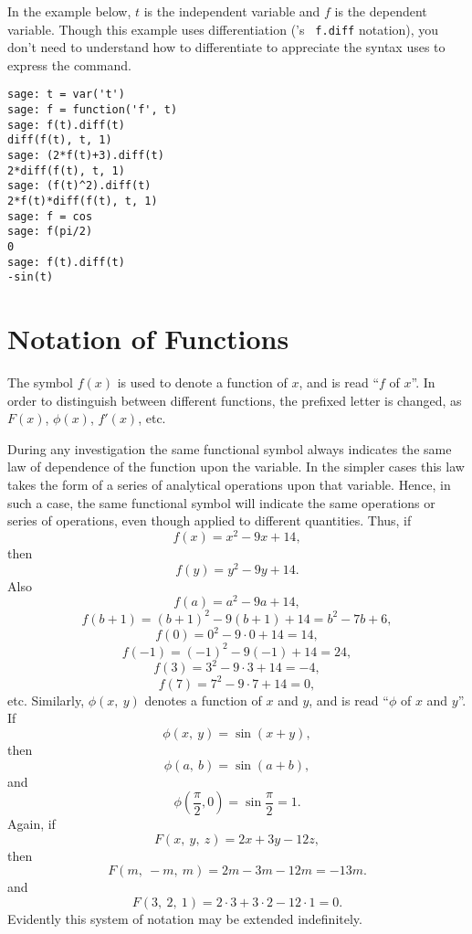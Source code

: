 In the \SAGE example below, $t$ is the independent variable and $f$ is the
dependent variable. Though this example uses differentiation (\SAGE's {\tt
f.diff} notation), you don't need to understand how to differentiate to
appreciate the syntax \SAGE uses to express the command.

\begin{Verbatim}[fontsize=\scriptsize,fontfamily=courier,fontshape=tt,frame=single,label=\SAGE]
sage: t = var('t')
sage: f = function('f', t)
sage: f(t).diff(t)
diff(f(t), t, 1)
sage: (2*f(t)+3).diff(t)
2*diff(f(t), t, 1)
sage: (f(t)^2).diff(t)
2*f(t)*diff(f(t), t, 1)
sage: f = cos
sage: f(pi/2)
0
sage: f(t).diff(t)
-sin(t)
\end{Verbatim}

\section{Notation of Functions}
\label{sec:02:06}

The symbol $f \left( x \right)$ is used to denote a function of $x$, and is
read ``$f$ of $x$''. In order to distinguish between different functions, the
prefixed letter is changed, as $F \left( x \right)$, $\phi \left( x \right)$,
$f' \left( x \right)$, etc.

During any investigation the same functional symbol always indicates the same
law of dependence of the function upon the variable.  In the simpler cases this
law takes the form of a series of analytical operations upon that variable.
Hence, in such a case, the same functional symbol will indicate the same
operations or series of operations, even though applied to different quantities.
Thus, if
\[
  f \left( x \right) = x^2 - 9x + 14,
\]
then 	
\[
  f \left( y \right) 	= y^2 - 9y + 14.
\]
Also 	
\[
  f \left( a \right) 	= a^2 - 9a + 14,
\]
\[
  f \left( b + 1 \right) =  \left( b + 1 \right)^2 - 9 \left( b + 1 \right) + 14
  = b^2 - 7b + 6,
\]
\[
  f \left( 0 \right) 	= 0^2 - 9 \cdot 0 + 14 = 14,
\]
\[
  f \left( -1 \right) 	=  \left( -1 \right)^2 - 9 \left( -1 \right) + 14 = 24,
\]
\[
  f \left( 3 \right) 	= 3^2 - 9 \cdot 3 + 14 = - 4,
\]
\[
  f \left( 7 \right) 	= 7^2 - 9 \cdot 7 + 14 = 0,
\]
etc. Similarly, $\phi \left( x,\ y \right)$ denotes a function of $x$ and $y$,
and is read ``$\phi$ of $x$ and $y$''. If 	
\[
  \phi \left( x,\ y \right) 	= \sin \left( x + y \right),
\]
then 	
\[
  \phi \left( a,\ b \right) 	= \sin \left( a + b \right),
\]
and 	
\[
  \phi \left( \frac{\pi}{2}, 0 \right)	= \sin \frac{\pi}{2} = 1.
\]
Again, if 	
\[
  F \left(  x,\ y,\ z  \right) 	= 2x + 3y - 12z,
\]
then 	
\[
  F \left( m,\ -m,\ m \right) 	= 2m - 3m - 12m = - 13m.
\]
and 	
\[
  F \left( 3,\ 2,\ 1 \right) 	= 2 \cdot 3 + 3 \cdot 2 - 12 \cdot 1 = 0.
\]
Evidently this system of notation may be extended indefinitely.

